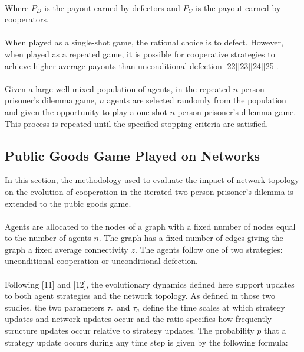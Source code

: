 \documentclass{article}
\begin{document}
	\paragraph{}Where $P_D$ is the payout earned by defectors and $P_C$ is the payout earned by cooperators.
	\paragraph{}When played as a single-shot game, the rational choice is to defect.  However, when played as a repeated game, it is possible for cooperative strategies to achieve higher average payouts than unconditional defection [22][23][24][25].
	\paragraph{}Given a large well-mixed population of agents, in the repeated $n$-person prisoner's dilemma game, $n$ agents are selected randomly from the population and given the opportunity to play a one-shot $n$-person prisoner's dilemma game.  This process is repeated until the specified stopping criteria are satisfied.

	\subsection{Public Goods Game Played on Networks}
	In this section, the methodology used to evaluate the impact of network topology on the evolution of cooperation in the iterated two-person prisoner's dilemma is extended to the pubic goods game.
	\paragraph{}Agents are allocated to the nodes of a graph with a fixed number of nodes equal to the number of agents $n$.  The graph has a fixed number of edges giving the graph a fixed average connectivity $z$.  The agents follow one of two strategies: unconditional cooperation or unconditional defection.
	\paragraph{}Following [11] and [12], the evolutionary dynamics defined here support updates to both agent strategies and the network topology.  As defined in those two studies, the two parameters $\tau_e$ and $\tau_a$ define the time scales at which strategy updates and network updates occur and the ratio  specifies how frequently structure updates occur relative to strategy updates.  The probability $p$ that a strategy update occurs during any time step is given by the following formula:
\end{document}
